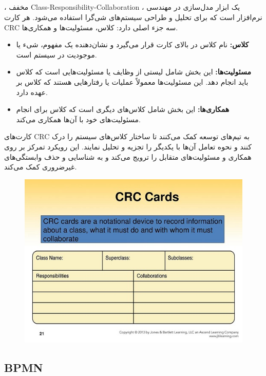 \subsection*{}

 ، مخفف Class-Responsibility-Collaboration ، یک ابزار مدل‌سازی در مهندسی نرم‌افزار است که برای تحلیل و طراحی سیستم‌های شی‌گرا استفاده می‌شود. هر کارت CRC سه جزء اصلی دارد: کلاس، مسئولیت‌ها و همکاری‌ها.

\begin{itemize}
	\item \textbf{کلاس:} نام کلاس در بالای کارت قرار می‌گیرد و نشان‌دهنده یک مفهوم، شیء یا موجودیت در سیستم است.
	\item \textbf{مسئولیت‌ها:} این بخش شامل لیستی از وظایف یا مسئولیت‌هایی است که کلاس باید انجام دهد. این مسئولیت‌ها معمولاً عملیات یا رفتارهایی هستند که کلاس بر عهده دارد.
	\item \textbf{همکاری‌ها:} این بخش شامل کلاس‌های دیگری است که کلاس برای انجام مسئولیت‌های خود با آن‌ها همکاری می‌کند.
\end{itemize}

کارت‌های CRC به تیم‌های توسعه کمک می‌کنند تا ساختار کلاس‌های سیستم را درک کنند و نحوه تعامل آن‌ها با یکدیگر را تجزیه و تحلیل نمایند. این رویکرد تمرکز بر روی همکاری و مسئولیت‌های متقابل را ترویج می‌کند و به شناسایی و حذف وابستگی‌های غیرضروری کمک می‌کند.

\begin{figure}[H]
	\centering
	\includegraphics{pic6.jpg}
	\label{fig:label4}
\end{figure}

\subsection*{BPMN}

